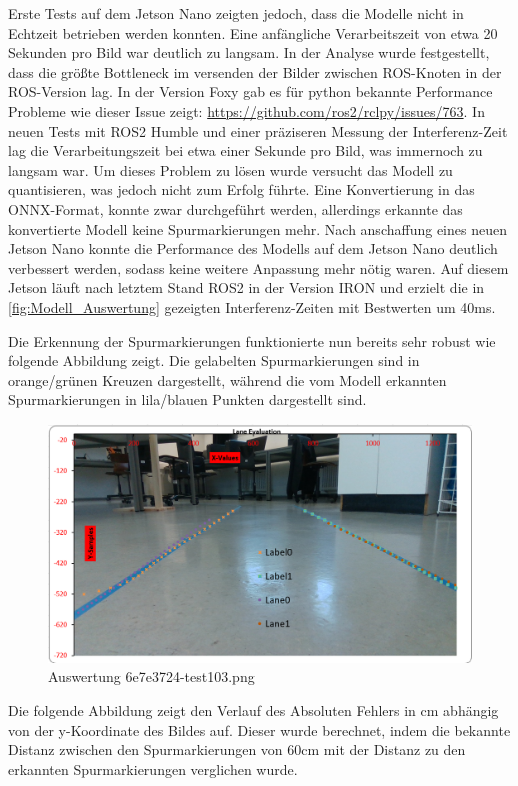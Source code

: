 \documentclass{article}
\begin{document}
            Erste Tests auf dem Jetson Nano zeigten jedoch, dass die Modelle nicht in Echtzeit betrieben werden konnten. Eine anfängliche Verarbeitszeit von etwa 20 Sekunden pro Bild war deutlich zu langsam.
            In der Analyse wurde festgestellt, dass die größte Bottleneck im versenden der Bilder zwischen ROS-Knoten in der ROS-Version lag. In der Version Foxy gab es für python bekannte Performance Probleme wie dieser Issue zeigt: \url{https://github.com/ros2/rclpy/issues/763}.
            In neuen Tests mit ROS2 Humble und einer präziseren Messung der Interferenz-Zeit lag die Verarbeitungszeit bei etwa einer Sekunde pro Bild, was immernoch zu langsam war.
            Um dieses Problem zu lösen wurde versucht das Modell zu quantisieren, was jedoch nicht zum Erfolg führte.
            Eine Konvertierung in das ONNX-Format, konnte zwar durchgeführt werden, allerdings erkannte das konvertierte Modell keine Spurmarkierungen mehr.
            Nach anschaffung eines neuen Jetson Nano konnte die Performance des Modells auf dem Jetson Nano deutlich verbessert werden, sodass keine weitere Anpassung mehr nötig waren.
            Auf diesem Jetson läuft nach letztem Stand ROS2 in der Version IRON und erzielt die in \ref{fig:Modell_Auswertung} gezeigten Interferenz-Zeiten mit Bestwerten um 40ms.

            Die Erkennung der Spurmarkierungen funktionierte nun bereits sehr robust wie folgende Abbildung zeigt.
            Die gelabelten Spurmarkierungen sind in orange/grünen Kreuzen dargestellt, während die vom Modell erkannten Spurmarkierungen in lila/blauen Punkten dargestellt sind.
            \begin{figure}[h!]
                \includegraphics[width=\linewidth]{Auswertung_6e7e3724-test_103.png}
                \caption{Auswertung 6e7e3724-test103.png}
                \label{fig:Auswertung_6e7e3724-test_103.png}
            \end{figure}
            Die folgende Abbildung zeigt den Verlauf des Absoluten Fehlers in cm abhängig von der y-Koordinate des Bildes auf.
            Dieser wurde berechnet, indem die bekannte Distanz zwischen den Spurmarkierungen von 60cm mit der Distanz zu den erkannten Spurmarkierungen verglichen wurde.
\end{document}
